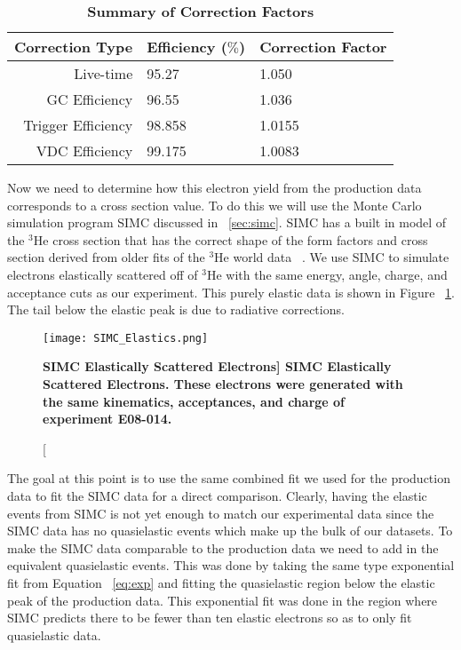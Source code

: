 \begin{table}[!h]
\centering
\begin{tabular}{|r | l l|}
\hline
\textbf{Correction Type} & \textbf{Efficiency ($\%$)} & \textbf{Correction Factor}\\
\hline
Live-time & 95.27 & 1.050 \\ 
GC Efficiency & 96.55 & 1.036 \\ 
Trigger Efficiency & 98.858 & 1.0155 \\ 
VDC Efficiency & 99.175 &  1.0083\\ 
\hline
\end{tabular}
\caption{{\bf{Summary of Correction Factors}} }
\label{tab:corrections}
\end{table}

Now we need to determine how this electron yield from the production data corresponds to a cross section value. To do this we will use the Monte Carlo simulation program SIMC discussed in ~\ref{sec:simc}. SIMC has a built in model of the $^3$He cross section that has the correct shape of the form factors and cross section derived from older fits of the $^3$He world data ~\cite{Article:Amroun}. We use SIMC to simulate electrons elastically scattered off of $^3$He with the same energy, angle, charge, and acceptance cuts as our experiment. This purely elastic data is shown in Figure ~\ref{fig:simc_elastics}. The tail below the elastic peak is due to radiative corrections.

\begin{figure}[!ht]
\begin{center}
\texttt{[image: SIMC\_Elastics.png]}
\end{center}
\caption[\bf{SIMC Elastically Scattered Electrons}]{
{\bf{SIMC Elastically Scattered Electrons.}} These electrons were generated with the same kinematics, acceptances, and charge of experiment E08-014.}
\label{fig:simc_elastics}
\end{figure}

The goal at this point is to use the same combined fit we used for the production data to fit the SIMC data for a direct comparison. Clearly, having the elastic events from SIMC is not yet enough to match our experimental data since the SIMC data has no quasielastic events which make up the bulk of our datasets. To make the SIMC data comparable to the production data we need to add in the equivalent quasielastic events. This was done by taking the same type exponential fit from Equation ~\ref{eq:exp} and fitting the quasielastic region below the elastic peak of the production data. This exponential fit was done in the region where SIMC predicts there to be fewer than ten elastic electrons so as to only fit quasielastic data. 

